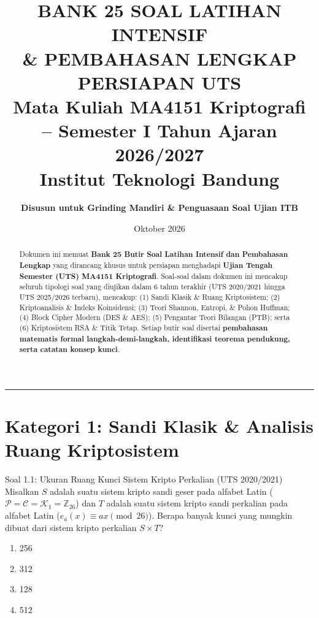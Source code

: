 \documentclass[11pt,a4paper]{article}
\title{
    \vspace{-1.5cm}
    \textbf{\huge BANK 25 SOAL LATIHAN INTENSIF}\\[0.2cm]
    \textbf{\Large \& PEMBAHASAN LENGKAP PERSIAPAN UTS}\\[0.3cm]
    \large Mata Kuliah MA4151 Kriptografi -- Semester I Tahun Ajaran 2026/2027\\[0.1cm]
    \large Institut Teknologi Bandung
}
\author{\textbf{Disusun untuk Grinding Mandiri \& Penguasaan Soal Ujian ITB}}
\date{Oktober 2026}
\begin{document}
\maketitle
\vspace{-0.5cm}

\begin{abstract}
Dokumen ini memuat \textbf{Bank 25 Butir Soal Latihan Intensif dan Pembahasan Lengkap} yang dirancang khusus untuk persiapan menghadapi \textbf{Ujian Tengah Semester (UTS) MA4151 Kriptografi}. Soal-soal dalam dokumen ini mencakup seluruh tipologi soal yang diujikan dalam 6 tahun terakhir (UTS 2020/2021 hingga UTS 2025/2026 terbaru), mencakup: (1) Sandi Klasik \& Ruang Kriptosistem; (2) Kriptoanalisis \& Indeks Koinsidensi; (3) Teori Shannon, Entropi, \& Pohon Huffman; (4) Block Cipher Modern (DES \& AES); (5) Pengantar Teori Bilangan (PTB); serta (6) Kriptosistem RSA \& Titik Tetap. Setiap butir soal disertai \textbf{pembahasan matematis formal langkah-demi-langkah, identifikasi teorema pendukung, serta catatan konsep kunci}.
\end{abstract}

\vspace{0.2cm}
\hrule
\vspace{0.3cm}

\tableofcontents
\newpage

\section{Kategori 1: Sandi Klasik \& Analisis Ruang Kriptosistem}

\begin{soalbox}{Soal 1.1: Ukuran Ruang Kunci Sistem Kripto Perkalian (UTS 2020/2021)}
Misalkan $S$ adalah suatu sistem kripto sandi geser pada alfabet Latin ($\mathcal{P} = \mathcal{C} = \mathcal{K}_1 = \mathbb{Z}_{26}$) dan $T$ adalah suatu sistem kripto sandi perkalian pada alfabet Latin ($e_a(x) \equiv ax \pmod{26}$).
Berapa banyak kunci yang mungkin dibuat dari sistem kripto perkalian $S \times T$?
\begin{enumerate}[label=(\alph*)]
    \item 256
    \item 312
    \item 128
    \item 512
\end{enumerate}
\end{soalbox}
\end{document}
